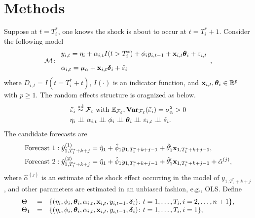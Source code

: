 \documentclass[12pt]{article}
\begin{document}
\section{Methods}

Suppose at $t=T_i^*$, one knows the shock is about to occur at $t=T_i^*+1$. Consider the following model
\begin{align*}
  \mathcal{M} \colon 
  \begin{array}{l}
    y_{i,t} = \eta_i +  \alpha_{i,t}I(t > T_i^*)+ \phi_i y_{i,t-1} + \mathbf{x}_{i,t}\boldsymbol{\theta}_i + \varepsilon_{i,t}\\[.3cm]
    \alpha_{i,t} = \mu_{\alpha} + \mathbf{x}_{i, t}\boldsymbol{\delta}_i + \tilde{\varepsilon}_i
  \end{array},
\end{align*}
where $D_{i,t}= I(t= T_i^* +t)$, $I(\cdot)$ is an indicator function, and $\mathbf{x}_{i,t}, \boldsymbol{\theta}_{i}\in \mathbb{R}^p$ with $p\geq 1$. The random effects structure is oragnized as below.
\begin{align*}
  \tilde{\varepsilon}_i &\simiid \mc{F}_{\tilde{\varepsilon}} \text{ with } \E_{\mc{F}_{\tilde{\varepsilon}}}, \Var_{\mc{F}_{\tilde{\varepsilon}}}(\tilde{\varepsilon}_i)= \sigma^2_{\alpha}  >0 \\
  \eta_i & \indep \alpha_{i,t} \indep \phi_i \indep \boldsymbol{\theta}_i \indep \varepsilon_{i,t} \indep \tilde{\varepsilon}_i.
\end{align*}
The candidate forecasts are
\begin{align*}
  &\text{Forecast 1}: \hat{y}_{1,T_1^*+k + j}^{(1)} = \hat\eta_1 
    + \hat\phi_1 y_{1,T_1^*+k+j-1} + \hat\theta_1'\mathbf{x}_{1,T_1^*+k+j-1} 
    , \\
  &\text{Forecast 2}: \hat{y}_{1,T_1^*+k+j}^{(2)} = \hat\eta_1 
    + \hat\phi_1 y_{1,T_1^*+k+j-1} + \hat{\theta}_1'\mathbf{x}_{1,T_1^*+k+j-1} 
    + \hat{\alpha}^{(j)},
\end{align*}
where $\hat{\alpha}^{(j)}$ is an estimate of the shock effect occurring in the model of $y_{1,T_1^*+k+j}$, and other parameters are estimated in an unbiased fashion, e.g., OLS. Define
\begin{align}
  \begin{array}{lll}
     \Theta &= &\{(\eta_i, \phi_i, \boldsymbol{\theta}_i, \alpha_{i,t}, \mathbf{x}_{i,t}, y_{i,t-1}, \boldsymbol{\delta}_i)\colon t= 1, \ldots, T_i, i = 2, \ldots, n +1\},\\
    \Theta_1 &= &\{(\eta_i, \phi_i, \boldsymbol{\theta}_i, \alpha_{i,t}, \mathbf{x}_{i,t}, y_{i,t-1}, \boldsymbol{\delta}_i)\colon t= 1, \ldots, T_i, i = 1\},\label{parameter}
  \end{array}
\end{align}
\end{document}
